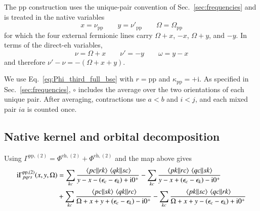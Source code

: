 \documentclass[aip,jcp,reprint,noshowkeys,superscriptaddress]{revtex4-1}
\newcommand{\eps}{\epsilon}
\newcommand{\ii}{\mathrm{i}}
\newcommand{\eh}{\text{eh}}
\newcommand{\teh}{\overline{\text{eh}}}
\newcommand{\pp}{\text{pp}}
\begin{document}
The $\pp$ construction uses the unique-pair convention of
Sec.~\ref{sec:frequencies} and is treated in the native variables
\begin{equation}
    x=\nu_\pp
    \qquad
    y=\nu'_\pp
    \qquad
    \Omega=\Omega_\pp
    \label{eq:pp_native_variables_third}
\end{equation}
for which the four external fermionic lines carry
$\Omega+x$, $-x$, $\Omega+y$, and $-y$.
In terms of the direct-$\eh$ variables,
\begin{equation}
    \nu=\Omega+x
    \qquad
    \nu'=-y
    \qquad
    \omega=y-x
    \label{eq:pp_inverse_frequency_map_third}
\end{equation}
and therefore $\nu'-\nu=-(\Omega+x+y)$.

We use Eq.~\eqref{eq:Phi_third_full_bse} with $r=\pp$ and
$\kappa_\pp=+\ii$. As specified in Sec.~\ref{sec:frequencies},
$\circ$ includes the average over the two orientations of each unique pair.
After averaging, contractions use $a<b$ and $i<j$, and each mixed pair
$ia$ is counted once. 

\subsection{Native kernel and orbital decomposition}

Using
$\Gamma^{\pp,(2)}=\Phi^{\eh,(2)}+\Phi^{\teh,(2)}$
and the map above gives
\begin{equation}
\begin{split}
    \ii\Gamma^{\pp,(2)}_{pqrs}(x,y,\Omega)
    &=
    \sum_{kc}
    \frac{
    \mel{pc}{}{rk}\mel{qk}{}{sc}
    }
    {y-x-(\eps_c-\eps_k)+\ii0^+}
    -
    \sum_{kc}
    \frac{
    \mel{pk}{}{rc}\mel{qc}{}{sk}
    }
    {y-x+(\eps_c-\eps_k)-\ii0^+}
    \\
    &+
    \sum_{kc}
    \frac{
    \mel{pc}{}{sk}\mel{qk}{}{rc}
    }
    {\Omega+x+y+(\eps_c-\eps_k)-\ii0^+}
    -
    \sum_{kc}
    \frac{
    \mel{pk}{}{sc}\mel{qc}{}{rk}
    }
    {\Omega+x+y-(\eps_c-\eps_k)+\ii0^+}
\end{split}
\label{eq:Gamma_pp_second_native_third}
\end{equation}
\end{document}
